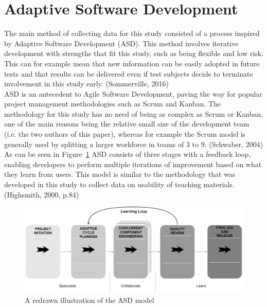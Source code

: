 \section{Adaptive Software Development}
The main method of collecting data for this study consisted of a process inspired by Adaptive Software Development (ASD). This method involves iterative development with strengths that fit this study, such as being flexible and low risk. This can for example mean that new information
can be easily adopted in future tests and that results can be delivered even if test subjects decide to terminate involvement in this study early. (Sommerville, 2016)\\
ASD is an antecedent to Agile Software Development, paving the way for popular project management methodologies such as Scrum and Kanban. The methodology for this study has no need of being as complex as Scrum or Kanban, one of the main reasons being the relative small size of the development team (i.e. the two authors of this paper), whereas for example the Scrum model is generally used by splitting a larger workforce in teams of 3 to 9. (Schwaber, 2004)\\
As can be seen in Figure~\ref{asd} ASD consists of three stages with a feedback loop, enabling developers to perform multiple iterations of improvement based on what they learn from users. This model is similar to the methodology that was developed in this study to collect data on usability of teaching materials. (Highsmith, 2000, p.84)\\

\begin{figure}
\hspace*{-1cm}
\centering
\includegraphics[scale=0.25]{figure/asd.png}
\caption{A redrawn illustration of the ASD model} %
\label{asd}
\end{figure}


